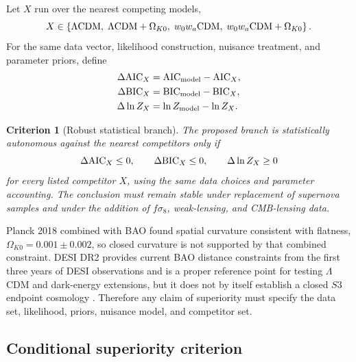 \documentclass[11pt,a4paper]{article}
\def\Sthree{S3}%
\numberwithin{equation}{section}
\newtheorem{criterion}{Criterion}
\theoremstyle{remark}
\newcommand{\Sthree}{S^3}
\begin{document}
Let \(X\) run over the nearest competing models,
\begin{equation}
X\in
\left\{
\Lambda{\rm CDM},\;
\Lambda{\rm CDM}+\Omega_{K0},\;
w_0w_a{\rm CDM},\;
w_0w_a{\rm CDM}+\Omega_{K0}
\right\}.
\end{equation}
For the same data vector, likelihood construction, nuisance treatment, and parameter priors, define
\begin{align}
\Delta{\rm AIC}_X
&=
{\rm AIC}_{\rm model}-{\rm AIC}_X,
\\
\Delta{\rm BIC}_X
&=
{\rm BIC}_{\rm model}-{\rm BIC}_X,
\\
\Delta\ln Z_X
&=
\ln Z_{\rm model}-\ln Z_X .
\end{align}

\begin{criterion}[Robust statistical branch]
The proposed branch is statistically autonomous against the nearest competitors only if
\begin{equation}
\Delta{\rm AIC}_X\le 0,
\qquad
\Delta{\rm BIC}_X\le 0,
\qquad
\Delta\ln Z_X\ge 0
\end{equation}
for every listed competitor \(X\), using the same data choices and parameter accounting. The conclusion must remain stable under replacement of supernova samples and under the addition of \(f\sigma_8\), weak-lensing, and CMB-lensing data.
\end{criterion}

Planck 2018 combined with BAO found spatial curvature consistent with flatness, \(\Omega_{K0}=0.001\pm0.002\), so closed curvature is not supported by that combined constraint. DESI DR2 provides current BAO distance constraints from the first three years of DESI observations and is a proper reference point for testing \(\Lambda\)CDM and dark-energy extensions, but it does not by itself establish a closed \(\Sthree\) endpoint cosmology \cite{Planck2018Parameters,DESI2025DR2BAO}. Therefore any claim of superiority must specify the data set, likelihood, priors, nuisance model, and competitor set.

\subsection{Conditional superiority criterion}
\end{document}

